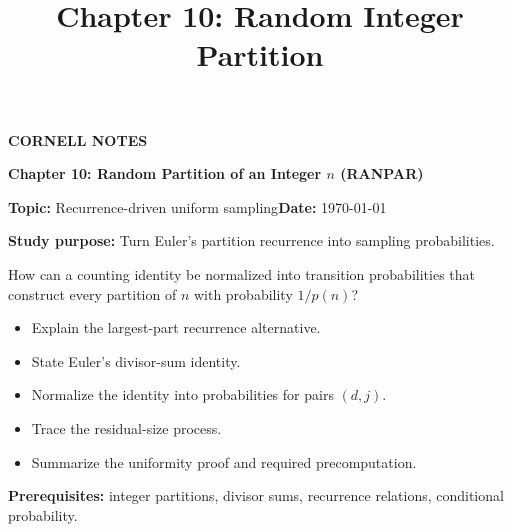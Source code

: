 \documentclass[10pt,letterpaper]{article}
\title{Chapter 10: Random Integer Partition}
\author{}
\date{}
\begin{document}
\maketitle
\begin{tcolorbox}[colback=Paper,colframe=Ink]{\small\bfseries\color{Teal}CORNELL NOTES}\par{\LARGE\bfseries Chapter 10: Random Partition of an Integer $n$ (RANPAR)}\par\medskip\textbf{Topic:} Recurrence-driven uniform sampling\hfill\textbf{Date:} \today\par\textbf{Study purpose:} Turn Euler's partition recurrence into sampling probabilities.\end{tcolorbox}
\begin{tcolorbox}[colback=Teal!5,colframe=Teal,title=Essential question]How can a counting identity be normalized into transition probabilities that construct every partition of $n$ with probability $1/p(n)$?\end{tcolorbox}
\begin{tcolorbox}[colback=white,colframe=Mist,title=Learning objectives]\begin{itemize}\item Explain the largest-part recurrence alternative.\item State Euler's divisor-sum identity.\item Normalize the identity into probabilities for pairs $(d,j)$.\item Trace the residual-size process.\item Summarize the uniformity proof and required precomputation.\end{itemize}\textbf{Prerequisites:} integer partitions, divisor sums, recurrence relations, conditional probability.\end{tcolorbox}
\end{document}
